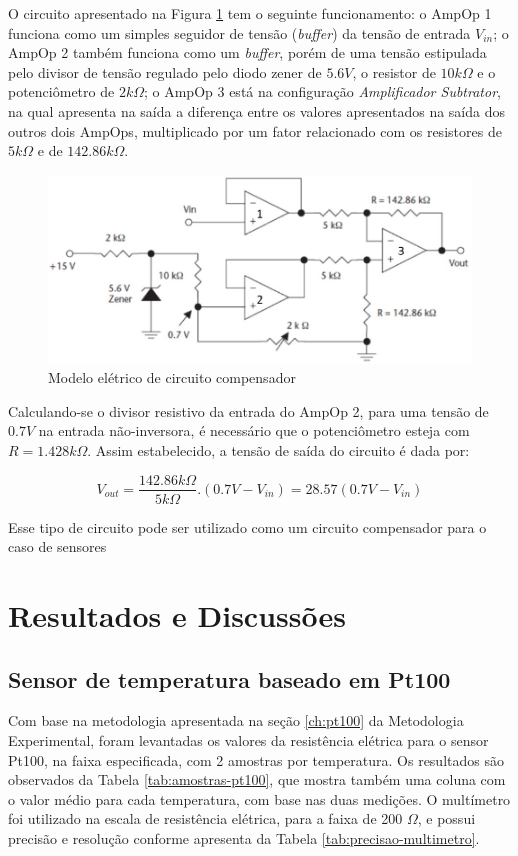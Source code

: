 \documentclass[a4paper]{instrumentacao}
\begin{document}
O circuito apresentado na Figura \ref{fig:ckt-compensador} tem o seguinte funcionamento: o AmpOp 1 funciona como um simples seguidor de tensão (\textit{buffer}) da tensão de entrada $V_{in}$; o AmpOp 2 também funciona como um \textit{buffer}, porém de uma tensão estipulada pelo divisor de tensão regulado pelo diodo zener de $5.6V$, o resistor de $10k\Omega$ e o potenciômetro de $2k\Omega$; o AmpOp 3 está na configuração \textit{Amplificador Subtrator}, na qual apresenta na saída a diferença entre os valores apresentados na saída dos outros dois AmpOps, multiplicado por um fator relacionado com os resistores de $5k\Omega$ e de $142.86k\Omega$.

\begin{figure}[H]
\center
\includegraphics[width=\textwidth]{ckt_compensacao.jpg}
\caption{Modelo elétrico de circuito compensador}
\label{fig:ckt-compensador}
\end{figure}

Calculando-se o divisor resistivo da entrada do AmpOp 2, para uma tensão de $0.7V$ na entrada não-inversora, é necessário que o potenciômetro esteja com $R=1.428k\Omega$. Assim estabelecido, a tensão de saída do circuito é dada por:

\begin{equation}
	V_{out}=\frac{142.86k\Omega}{5k\Omega}.(0.7V-V_{in})=28.57(0.7V-V_{in})
	\label{eq:ckt-compensador-saida}
\end{equation}

Esse tipo de circuito pode ser utilizado como um circuito compensador para o caso de sensores 


\chapter{Resultados e Discussões}
\section{Sensor de temperatura baseado em Pt100}
Com base na metodologia apresentada na seção \ref{ch:pt100} da Metodologia Experimental, foram levantadas os valores da resistência elétrica para o sensor Pt100, na faixa especificada, com 2 amostras por temperatura. Os resultados são observados da Tabela \ref{tab:amostras-pt100}, que mostra também uma coluna com o valor médio para cada temperatura, com base nas duas medições. O multímetro foi utilizado na escala de resistência elétrica, para a faixa de 200 $\Omega$, e possui precisão e resolução conforme apresenta da Tabela \ref{tab:precisao-multimetro}.
\end{document}
